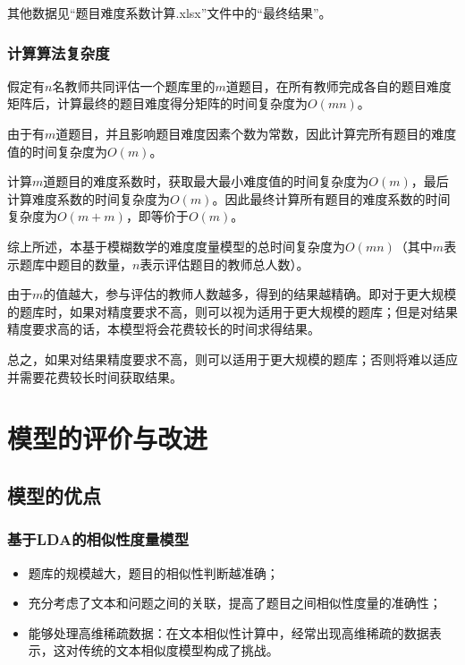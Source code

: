 其他数据见“题目难度系数计算.xlsx”文件中的“最终结果”。

\subsubsection{计算算法复杂度}

假定有$n$名教师共同评估一个题库里的$m$道题目，在所有教师完成各自的题目难度矩阵后，计算最终的题目难度得分矩阵的时间复杂度为$O(mn)$。

由于有$m$道题目，并且影响题目难度因素个数为常数，因此计算完所有题目的难度值的时间复杂度为$O(m)$。

计算$m$道题目的难度系数时，获取最大最小难度值的时间复杂度为$O(m)$，最后计算难度系数的时间复杂度为$O(m)$。因此最终计算所有题目的难度系数的时间复杂度为$O(m + m)$，即等价于$O(m)$。

综上所述，本基于模糊数学的难度度量模型的总时间复杂度为$O(mn)$（其中$m$表示题库中题目的数量，$n$表示评估题目的教师总人数）。

由于$m$的值越大，参与评估的教师人数越多，得到的结果越精确。即对于更大规模的题库时，如果对精度要求不高，则可以视为适用于更大规模的题库；但是对结果精度要求高的话，本模型将会花费较长的时间求得结果。

总之，如果对结果精度要求不高，则可以适用于更大规模的题库；否则将难以适应并需要花费较长时间获取结果。

%
%

\section{模型的评价与改进}

\subsection{模型的优点}

\subsubsection{基于LDA的相似性度量模型}

\begin{itemize}
    \item 题库的规模越大，题目的相似性判断越准确；
    \item 充分考虑了文本和问题之间的关联，提高了题目之间相似性度量的准确性；
    \item 能够处理高维稀疏数据：在文本相似性计算中，经常出现高维稀疏的数据表示，这对传统的文本相似度模型构成了挑战。
\end{itemize}

